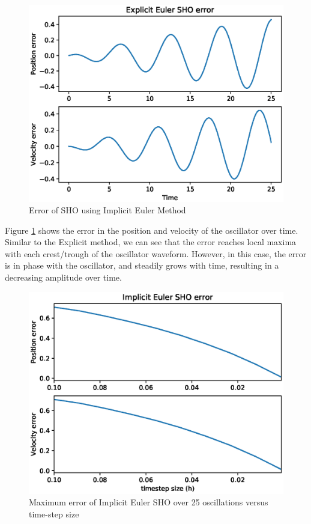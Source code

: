\documentclass{article}
\begin{document}
\begin{figure}[h!]
\centering
\includegraphics[scale=.75]{fig/implicit_error.eps}
\caption{Error of SHO using Implicit Euler Method}
\label{fig:imp_error}
\end{figure}

Figure \ref{fig:imp_error} shows the error in the position and velocity of the oscillator over time.  Similar to the Explicit method, we can see that the error reaches local maxima with each crest/trough of the oscillator waveform.  However, in this case, the error is in phase with the oscillator, and steadily grows with time, resulting in a decreasing amplitude over time.  

\newpage

\begin{figure}[h!]
\centering
\includegraphics[scale=0.75]{fig/implicit_error_vs_h.eps}
\caption{Maximum error of Implicit Euler SHO over 25 oscillations versus time-step size}
\label{fig:imp_error_h}
\end{figure}
\end{document}
